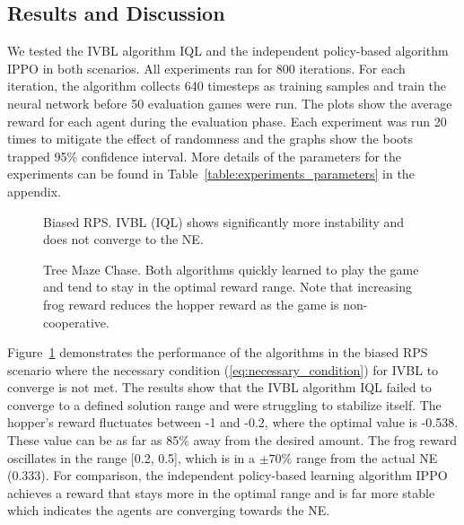 \documentclass[]{interact}
\theoremstyle{plain}%
\theoremstyle{definition}
\theoremstyle{remark}
\begin{document}
\subsection{Results and Discussion}
We tested the IVBL algorithm IQL and the independent policy-based algorithm IPPO in both scenarios. All experiments ran for 800 iterations. For each iteration, the algorithm collects 640 timesteps as training samples and train the neural network before 50 evaluation games were run. The plots show the average reward for each agent during the evaluation phase. Each experiment was run 20 times to mitigate the effect of randomness and the graphs show the boots trapped 95\% confidence interval. More details of the parameters for the experiments can be found in Table~\ref{table:experiments_parameters} in the appendix.

\begin{figure}
\centering
{}
\caption{Biased RPS. IVBL (IQL) shows significantly more instability and does not converge to the NE.}
\label{fig:biased_rps_in_food_chain_rewards}
\end{figure}

\begin{figure}
\centering
{}
\caption{Tree Maze Chase. Both algorithms quickly learned to play the game and tend to stay in the optimal reward range. Note that increasing frog reward reduces the hopper reward as the game is non-cooperative.}
\label{fig:tree_maze_chase_rewards}
\end{figure}

Figure~\ref{fig:biased_rps_in_food_chain_rewards} demonstrates the performance of the algorithms in the biased RPS scenario where the necessary condition (\ref{eq:necessary_condition}) for IVBL to converge is not met. The results show that the IVBL algorithm IQL failed to converge to a defined solution range and were struggling to stabilize itself. The hopper's reward fluctuates between -1 and -0.2, where the optimal value is -0.538. These value can be as far as 85\% away from the desired amount. The frog reward oscillates in the range [0.2, 0.5], which is in a $\pm 70\%$  range from the actual NE (0.333). For comparison, the independent policy-based learning algorithm IPPO achieves a reward that stays more in the optimal range and is far more stable which indicates the agents are converging towards the NE.
\end{document}

